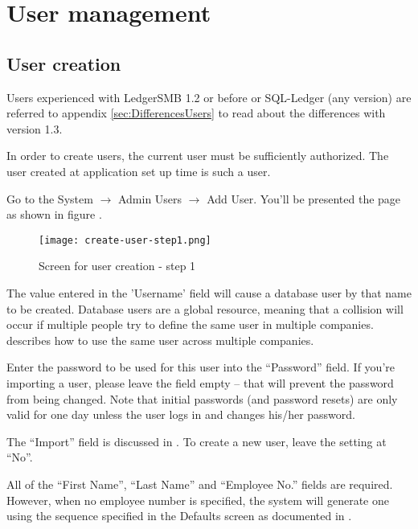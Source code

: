 


\chapter{User management}
\label{cha:user-management}

\section{User creation}
\label{sec:user-creation}

Users experienced with LedgerSMB 1.2 or before or SQL-Ledger (any version) are
referred to appendix \ref{sec:DifferencesUsers} to read about the differences
with version 1.3.

In order to create users, the current user must be sufficiently authorized. The user
created at application set up time is such a user.

Go to the System $\rightarrow$ Admin Users $\rightarrow$ Add User. You'll be presented the page as shown in figure .

\begin{figure}[h]
\texttt{[image: create-user-step1.png]}
\caption{Screen for user creation - step 1}
\end{figure}
\label{fig:create-user-step1}

The value entered in the 'Username' field will cause a database user by that name
to be created. Database users are a global resource, meaning that a collision will
occur if multiple people try to define the same user in multiple companies.
 describes how to use the same user across multiple companies.

Enter the password to be used for this user into the ``Password'' field. If you're
importing a user, please leave the field empty -- that will prevent the password
from being changed.  Note that initial passwords (and password resets) are only 
valid for one day unless the user logs in and changes his/her password.

The ``Import'' field is discussed in . To create a new
user, leave the setting at ``No''.

All of the ``First Name'', ``Last Name'' and ``Employee No.'' fields are required.
However, when no employee number is specified, the system will generate one using
the sequence specified in the Defaults screen as documented in
.

